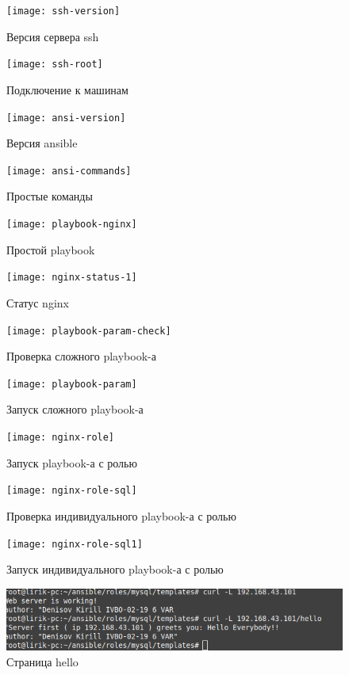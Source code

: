 \documentclass[a4paper,14pt]{extarticle}
\begin{document}
\begin{figure}[hptb]
	\centering
	\texttt{[image: ssh-version]}
	\caption{Версия сервера ssh}
	\label{img:ssh-version}
\end{figure}
\begin{figure}[hptb]
	\centering
	\texttt{[image: ssh-root]}
	\caption{Подключение к машинам}
	\label{img:ssh-root}
\end{figure}
\newpage
\begin{figure}[hptb]
	\centering
	\texttt{[image: ansi-version]}
	\caption{Версия ansible}
	\label{img:ansi-version}
\end{figure}

\begin{figure}[hptb]
	\centering
	\texttt{[image: ansi-commands]}
	\caption{Простые команды}
	\label{img:ansi-commands}
\end{figure}

\begin{figure}[hptb]
	\centering
	\texttt{[image: playbook-nginx]}
	\caption{Простой playbook}
	\label{img:playbook-nginx.yml}
\end{figure}
\newpage
\begin{figure}[hptb]
	\centering
	\texttt{[image: nginx-status-1]}
	\caption{Статус nginx}
	\label{img:nginx-status-1}
\end{figure}

\begin{figure}[hptb]
	\centering
	\texttt{[image: playbook-param-check]}
	\caption{Проверка сложного playbook-а}
	\label{img:playbook-param-check}
\end{figure}
\newpage
\begin{figure}[hptb]
	\centering
	\texttt{[image: playbook-param]}
	\caption{Запуск сложного playbook-а}
	\label{img:playbook-param}
\end{figure}

\begin{figure}[hptb]
	\centering
	\texttt{[image: nginx-role]}
	\caption{Запуск playbook-а с ролью}
	\label{img:nginx-role}
\end{figure}

\begin{figure}[hptb]
	\centering
	\texttt{[image: nginx-role-sql]}
	\caption{Проверка индивидуального playbook-а с ролью}
	\label{img:nginx-role-sql}
\end{figure}

\begin{figure}[hptb]
	\centering
	\texttt{[image: nginx-role-sql1]}
	\caption{Запуск индивидуального playbook-а с ролью}
	\label{img:nginx-role-sql1}
\end{figure}

\begin{figure}[hptb]
	\centering
	\includegraphics[width=0.7\linewidth]{hello-nginx}
	\caption{Страница hello}
	\label{img:hello-nginx}
\end{figure}
\end{document}
